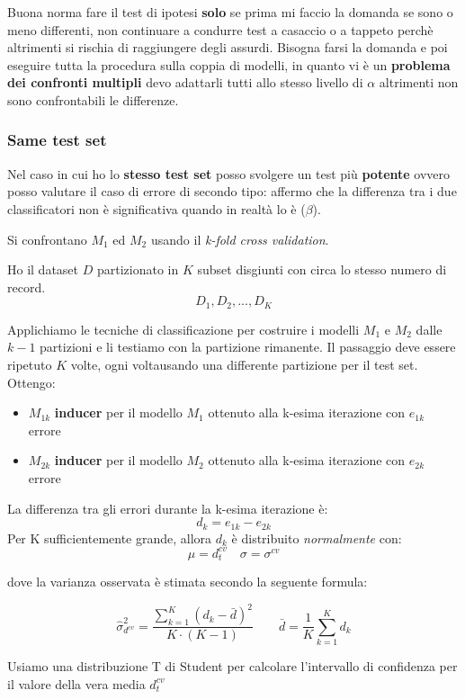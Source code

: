 Buona norma fare il test di ipotesi \textbf{solo} se prima mi faccio la domanda se sono o meno differenti, non continuare a condurre test a casaccio o a tappeto perch\`e altrimenti si rischia di raggiungere degli assurdi. Bisogna farsi la domanda e poi eseguire tutta la procedura sulla coppia di modelli, in quanto vi \`e un \textbf{problema dei confronti multipli} devo adattarli tutti allo stesso livello di $\alpha$ altrimenti non sono confrontabili le differenze. \\

\subsubsection{Same test set}
Nel caso in cui ho lo \textbf{stesso test set} posso svolgere un test pi\`u \textbf{potente} ovvero posso valutare il caso di errore di secondo tipo: affermo che la differenza tra i due classificatori non \`e significativa quando in realt\`a lo \`e ($\beta$). 

Si confrontano $M_1$ ed $M_2$ usando il \textit{k-fold cross validation}.

Ho il dataset $D$ partizionato in $K$ subset disgiunti con circa lo stesso numero di record. 
\[D_1, D_2, ..., D_K\]

Applichiamo le tecniche di classificazione per costruire i modelli $M_1$ e $M_2$ dalle $k-1$ partizioni e li testiamo con la partizione rimanente. Il passaggio deve essere ripetuto $K$ volte, ogni voltausando una differente partizione per il test set. Ottengo:
\begin{itemize}
	\item $M_{1k}$ \textbf{inducer} per il modello $M_1$ ottenuto alla k-esima iterazione con $e_{1k}$ errore
	\item $M_{2k}$ \textbf{inducer} per il modello $M_2$ ottenuto alla k-esima iterazione con $e_{2k}$ errore
\end{itemize}

La differenza tra gli errori durante la k-esima iterazione è:
\[d_k = e_{1k} - e_{2k}\]
Per K sufficientemente grande, allora $d_k$ \`e distribuito \textit{normalmente} con: 
\[\mu = d_t^{cv} \quad \sigma = \sigma^{cv}\]

dove la varianza osservata \`e stimata secondo la seguente formula: 

\[ \hat{\sigma}^2_{d^{cv}} = \frac{\sum_{k=1}^{K}(d_k - \bar{d})^2}{K \cdot (K-1)} \qquad \bar{d} = \frac{1}{K} \sum_{k=1}^K d_k \]

Usiamo una distribuzione T di Student per calcolare l'intervallo di confidenza per il valore della vera media $d_t^{cv}$

